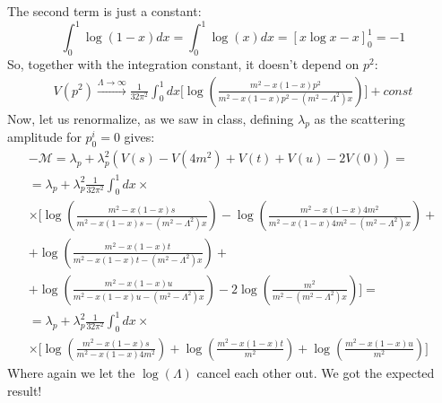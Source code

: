 \documentclass{article}
\begin{document}
The second term is just a constant:
\begin{equation}
    \int_0^1 \log(1 - x) dx = \int_0^1 \log(x) dx = \left[x\log x - x\right]_0^1 = -1
\end{equation}
So, together with the integration constant, it doesn't depend on $p^2$:
\begin{equation}
\begin{gathered}
    V\left(p^2\right) \xrightarrow{\Lambda \rightarrow \infty}
    \frac{1}{32\pi^2} \int_0^1 dx
    \Bigg[
        \log(\frac{m^2 - x(1 - x) p^2}{m^2 - x(1 - x) p^2 - \left(m^2 - \Lambda^2\right) x})\Bigg] + const 
\end{gathered}
\end{equation}
Now, let us renormalize, as we saw in class, defining $\lambda_p$ as the scattering amplitude for $p_0^i = 0$ gives:
\begin{equation}
\begin{gathered}
    -\mathcal{M} = \lambda_p + \lambda_p^2 \left(V(s) - V(4m^2) + V(t) + V(u) - 2V(0)\right) = \\ =
    \lambda_p + \lambda_p^2 \frac{1}{32\pi^2} \int_0^1 dx \times \\ \times \Bigg[
        \log(\frac{m^2 - x(1 - x) s}{m^2 - x(1 - x) s - \left(m^2 - \Lambda^2\right) x})
        - \log(\frac{m^2 - x(1 - x) 4m^2}{m^2 - x(1 - x) 4m^2 - \left(m^2 - \Lambda^2\right) x}) + \\
        + \log(\frac{m^2 - x(1 - x) t}{m^2 - x(1 - x) t - \left(m^2 - \Lambda^2\right) x}) + \\
        + \log(\frac{m^2 - x(1 - x) u}{m^2 - x(1 - x) u - \left(m^2 - \Lambda^2\right) x})
        - 2\log(\frac{m^2}{m^2 - \left(m^2 - \Lambda^2\right) x})\Bigg] = \\ =
        \lambda_p + \lambda_p^2 \frac{1}{32\pi^2} \int_0^1 dx \times \\ \times \Bigg[
        \log(\frac{m^2 - x(1 - x) s}{m^2 - x(1 - x) 4m^2})
        + \log(\frac{m^2 - x(1 - x) t}{m^2}) + \log(\frac{m^2 - x(1 - x) u}{m^2})\Bigg]
\end{gathered}
\end{equation}
Where again we let the $\log(\Lambda)$ cancel each other out. We got the expected result!
\end{document}
